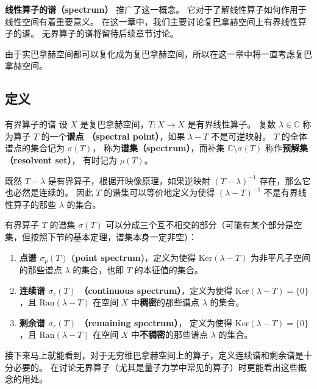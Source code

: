 
\textbf{线性算子的谱（spectrum）} 推广了这一概念。 它对于了解线性算子如何作用于线性空间有着重要意义。 在这一章中，我们主要讨论复巴拿赫空间上有界线性算子的谱。 无界算子的谱将留待后续章节讨论。

由于实巴拿赫空间都可以复化成为复巴拿赫空间，所以在这一章中将一直考虑复巴拿赫空间。

\subsection{定义}
\begin{definition}{有界算子的谱}
设 $X$ 是复巴拿赫空间，$T:X\to X$ 是有界线性算子。 复数 $\lambda\in\mathbb{C}$ 称为算子 $T$ 的一个\textbf{谱点 （spectral point）}，如果 $\lambda-T$ 不是可逆映射。 $T$ 的全体谱点的集合记为 $\sigma(T)$， 称为\textbf{谱集（spectrum）}，而补集 $\mathbb{C}\setminus\sigma(T)$ 称作\textbf{预解集（resolvent set）}， 有时记为 $\rho(T)$。
\end{definition}

既然 $T-\lambda$ 是有界算子，根据开映像原理，如果逆映射 $(T-\lambda)^{-1}$ 存在，那么它也必然是连续的。 因此 $T$ 的谱集可以等价地定义为使得 $(\lambda-T)^{-1}$ 不是有界线性算子的那些 $\lambda$ 的集合。

有界算子 $T$ 的谱集 $\sigma(T)$ 可以分成三个互不相交的部分（可能有某个部分是空集，但按照下节的基本定理，谱集本身一定非空）：

\begin{enumerate}
\item \textbf{点谱 $\sigma_p(T)$ (point spectrum)}，定义为使得 $\text{Ker}(\lambda-T)$ 为非平凡子空间的那些谱点 $\lambda$ 的集合，也即 $T$ 的本征值的集合。

\item \textbf{连续谱 $\sigma_c(T)$ （continuous spectrum）}，定义为使得 $\text{Ker}(\lambda-T)=\{0\}$，且 $\text{Ran}(\lambda-T)$ 在空间 $X$ 中\textbf{稠密}的那些谱点 $\lambda$ 的集合。

\item \textbf{剩余谱 $\sigma_r(T)$ （remaining spectrum）}， 定义为使得 $\text{Ker}(\lambda-T)=\{0\}$，且 $\text{Ran}(\lambda-T)$ 在空间 $X$ 中\textbf{不稠密}的那些谱点 $\lambda$ 的集合。
\end{enumerate}

接下来马上就能看到，对于无穷维巴拿赫空间上的算子，定义连续谱和剩余谱是十分必要的。 在讨论无界算子（尤其是量子力学中常见的算子）时更能看出这些概念的用处。

